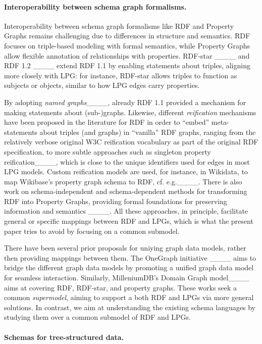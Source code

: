 \paragraph{Interoperability between schema graph formalisms.}

Interoperability between schema graph formalisms like RDF and Property Graphs remains challenging due to differences in structure and semantics. RDF focuses on triple-based modeling with formal semantics, while Property Graphs allow flexible annotation of relationships with properties. RDF-star ____ and RDF 1.2 ____ extend RDF 1.1 by enabling statements about triples, aligning more closely with LPG: for instance, RDF-star allows triples to function as subjects or objects, similar to how LPG edges carry properties.

By adopting \emph{named graphs}____, already RDF 1.1 provided a mechanism for making statements about (sub-)graphs. Likewise, different \emph{reification} mechanisms have been proposed in the literature for RDF in order to ``embed'' meta-statements about triples (and graphs) in ``vanilla'' RDF graphs, ranging from the relatively verbose original W3C reification vocabulary as part of the original RDF specification, to more subtle approaches such as singleton property reification____, which is close to the unique identifiers used for edges in most LPG models. Custom reification models are used, for instance, in Wikidata, to map Wikibase's property graph schema to RDF, cf. e.g.____.
There is also work on  schema-independent and schema-dependent methods for transforming RDF into Property Graphs, providing formal foundations for preserving information and semantics ____.
All these approaches, in principle, facilitate general or specific mappings between RDF and LPGs, which is what the present paper tries to avoid by focusing on a common submodel.

There have been several prior proposals for uniying graph data models, rather then providing mappings between them.  The OneGraph initiative ____ aims to bridge the different graph data models by promoting a unified graph data model for seamless interaction. Similarly, MilleniumDB's Domain Graph model____ aims at covering RDF, RDF-star, and property graphs. These works seek a common \emph{supermodel}, aiming to support a both RDF and LPGs via more general solutions. In contrast, we aim at understanding the existing schema languages by studying them over a common submodel of RDF and LPGs.

\paragraph{Schemas for tree-structured data.}

